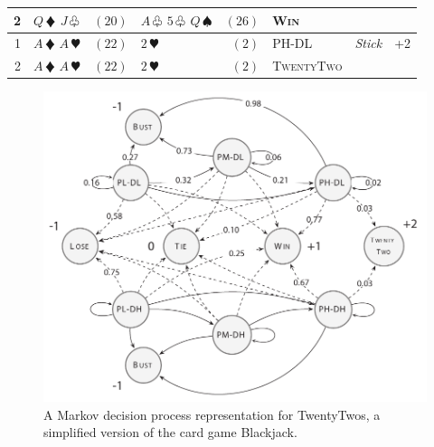 \documentclass[xcolor={table}]{beamer}
\newcommand{\Midrule}[0]{\hline}
\newcommand{\Botrule}[0]{\hline}
\newcommand{\rlState}[1]{\textsc{#1}} %
\newcommand{\rlAction}[1]{\textit{#1}} %
\begin{document}
\begin{frame}
\begin{table}[!t]
\begin{scriptsize}
{\begin{tabular*}{\textwidth}{@{\extracolsep{\fill}} rlrlrllr @{}}
2 & $Q\,\vardiamond$ $J\,\varclub$ &  $(20)$ & $A\,\varclub$ $5\,\varclub$ $Q\,\spadesuit$ & $(26)$ & \rlState{Win} &  &  ~ \\
\Midrule
1 & $A\,\vardiamond$ $A\,\varheart$ &  $(22)$ & $2\,\varheart$ & $(2)$ & \rlState{PH-DL} & \rlAction{Stick} &  +2 \\
2 & $A\,\vardiamond$ $A\,\varheart$ &  $(22)$ & $2\,\varheart$ & $(2)$ & \rlState{TwentyTwo} &  &  ~ \\
\Botrule
\end{tabular*}
}
{}
\end{scriptsize}
\end{table}
\end{frame} 



 \begin{frame}[plain]
\begin{figure}[!t]
\begin{centering}
\includegraphics[width=0.9\linewidth]{images/fmlpda_figure_11_3.pdf}
 \caption{A Markov decision process representation for TwentyTwos, a simplified version of the card game Blackjack.}
       \label{fig:blackjack_mdp}
       \end{centering}
\end{figure}
\end{frame} 
\end{document}
